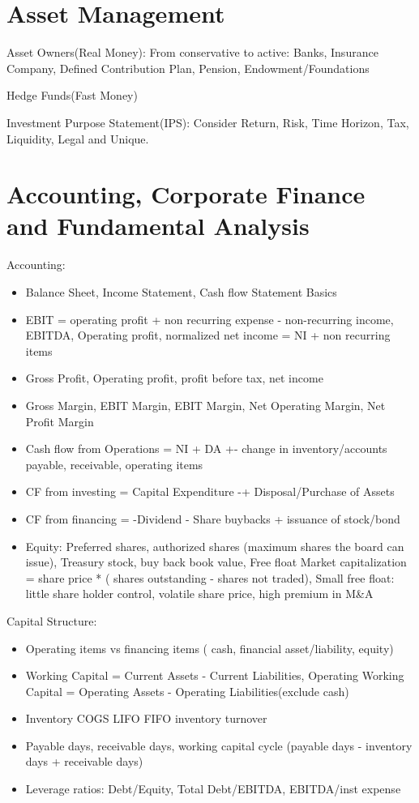 \documentclass[11pt, openany]{book}              %
\begin{document}
\section{Asset Management}

Asset Owners(Real Money): From conservative to active: Banks, Insurance Company, Defined Contribution Plan, Pension, Endowment/Foundations 

Hedge Funds(Fast Money)

Investment Purpose Statement(IPS): Consider Return, Risk, Time Horizon, Tax, Liquidity, Legal and Unique. 

\section{Accounting, Corporate Finance and Fundamental Analysis}

Accounting:
\begin{itemize}
    \item Balance Sheet, Income Statement, Cash flow Statement Basics
    \item EBIT = operating profit + non recurring expense - non-recurring income, EBITDA, Operating profit, normalized net income = NI + non recurring items
    \item Gross Profit, Operating profit, profit before tax, net income
    \item Gross Margin, EBIT Margin, EBIT Margin, Net Operating Margin, Net Profit Margin 
    \item Cash flow from Operations = NI + DA +- change in inventory/accounts payable, receivable, operating items
    \item CF from investing = Capital Expenditure -+ Disposal/Purchase of Assets
    \item CF from financing = -Dividend - Share buybacks + issuance of stock/bond
    \item Equity: Preferred shares, authorized shares (maximum shares the board can issue), Treasury stock, buy back book value, Free float Market capitalization = share price * ( shares outstanding - shares not traded), Small free float: little share holder control, volatile share price, high premium in M\&A 
\end{itemize}

Capital Structure:

\begin{itemize}
	\item Operating items vs financing items ( cash, financial asset/liability, equity)
	\item Working Capital = Current Assets - Current Liabilities, Operating Working Capital = Operating Assets - Operating Liabilities(exclude cash)
	\item Inventory COGS LIFO FIFO inventory turnover
	\item Payable days, receivable days, working capital cycle (payable days - inventory days + receivable days)
	\item Leverage ratios: Debt/Equity, Total Debt/EBITDA, EBITDA/inst expense	
\end{itemize}
\end{document}
